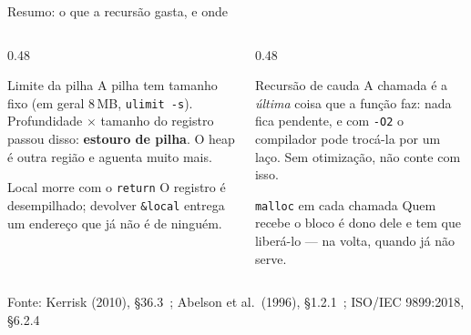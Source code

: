 \documentclass[aspectratio=169]{beamer}
\newcommand{\fonte}[1]{\vfill\hfill{\scriptsize\textcolor{UFSGray}{Fonte: #1}}}
\begin{document}
\begin{frame}{Resumo: o que a recursão gasta, e onde}
  \begin{columns}[T]
    \begin{column}{0.48\textwidth}
      \begin{block}{Limite da pilha}
        \small A pilha tem tamanho fixo (em geral 8\,MB, \texttt{ulimit -s}).
        Profundidade $\times$ tamanho do registro passou disso: \textbf{estouro
        de pilha}. O heap é outra região e aguenta muito mais.
      \end{block}
      \begin{block}{Local morre com o \texttt{return}}
        \small O registro é desempilhado; devolver \texttt{\&local} entrega
        um endereço que já não é de ninguém.
      \end{block}
    \end{column}
    \begin{column}{0.48\textwidth}
      \begin{block}{Recursão de cauda}
        \small A chamada é a \emph{última} coisa que a função faz: nada fica
        pendente, e com \texttt{-O2} o compilador pode trocá-la por um laço.
        Sem otimização, não conte com isso.
      \end{block}
      \begin{exampleblock}{\texttt{malloc} em cada chamada}
        \small Quem recebe o bloco é dono dele e tem que liberá-lo --- na
        volta, quando já não serve.
      \end{exampleblock}
    \end{column}
  \end{columns}
  \fonte{Kerrisk (2010), §36.3~\cite{kerrisk2010linux}; Abelson et al.\ (1996), §1.2.1~\cite{abelson1996structure}; ISO/IEC 9899:2018, §6.2.4~\cite{iso2018c17}}
\end{frame}
\end{document}
